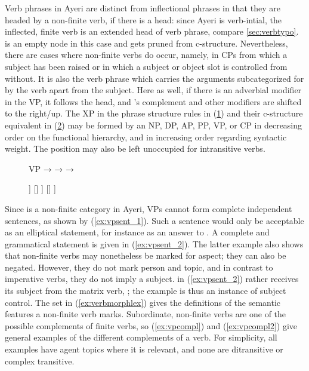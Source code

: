 Verb phrases in Ayeri are distinct from inflectional phrases in that they are
headed by a non-finite verb, if there is a head: since Ayeri is verb-intial,
the inflected, finite verb is an extended head of verb phrase, compare
\autoref{sec:verbtypo}.  is an empty node in this case and gets
pruned from c-structure. Nevertheless, there are cases where non-finite verbs
do occur, namely, in CPs from which a subject has been raised or in which a
subject or object slot is controlled from without. It is also the verb phrase
which carries the arguments subcategorized for by the verb apart from the
subject. Here as well, if there is an adverbial modifier in the VP, it follows
the head, and 's complement and other modifiers are shifted to the
right/up. The XP in the phrase structure rules in (\ref{ex:vppstruct}) and
their c-structure equivalent in (\ref{ex:vpcstruct}) may be formed by an NP,
DP, AP, PP, VP, or CP in decreasing order on the functional hierarchy, and in
increasing order regarding syntactic weight. The position may also be left
unoccupied for intransitive verbs.

\begin{figure}
\pex\label{ex:vppstruct}
\a VP →  
\a {} →  
\a {} →  
\xe
\end{figure}

\begin{figure}
\ex\label{ex:vpcstruct}
\begin{forest}
[\anno{VP}
			[\anno{\xbar{V}}
				[\anno{\xhead{V}}
					[\anno{\xhead{V}}]
					[\anno{Cl}]
				]
				[{}]
			]
		[{}]
]
\end{forest}
\xe
\end{figure}

Since  is a non-finite category in Ayeri, VPs cannot form complete
independent sentences, as shown by (\ref{ex:vpsent_1}). Such a sentence would
only be acceptable as an elliptical statement, for instance as an answer to
. A complete and
grammatical statement is given in (\ref{ex:vpsent_2}). The latter example also
shows that non-finite verbs may nonetheless be marked for aspect; they can also
be negated. However, they do not mark person and topic, and in contrast to
imperative verbs, they do not imply a subject.  in
(\ref{ex:vpsent_2}) rather receives its subject from the matrix verb,
; the example is thus an instance of subject
control. The set in (\ref{ex:verbmorphlex}) gives the definitions of the
semantic features a non-finite verb marks. Subordinate, non-finite verbs are
one of the possible complements of finite verbs, so (\ref{ex:vpcompl}) and
(\ref{ex:vpcompl2}) give general examples of the different complements of a
verb. For simplicity, all examples have agent topics where it is relevant, and
none are ditransitive or complex transitive.

